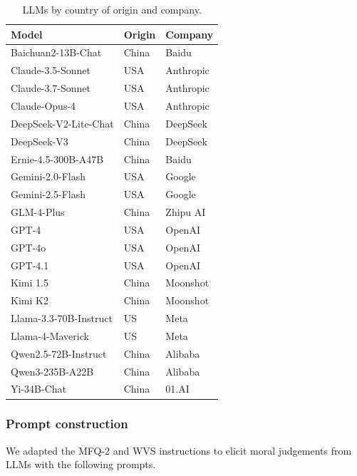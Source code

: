 \documentclass[11pt,a4paper]{article}
\begin{document}
\begin{table}[h]
\centering
\begin{tabular}{l l l}
Model & Origin & Company\\\hline
Baichuan2-13B-Chat & China & Baidu \\
Claude-3.5-Sonnet & USA & Anthropic \\
Claude-3.7-Sonnet & USA & Anthropic \\
Claude-Opus-4 & USA & Anthropic \\
DeepSeek-V2-Lite-Chat & China & DeepSeek \\
DeepSeek-V3 & China & DeepSeek \\
Ernie-4.5-300B-A47B & China & Baidu \\
Gemini-2.0-Flash & USA & Google \\
Gemini-2.5-Flash & USA & Google \\
GLM-4-Plus & China & Zhipu AI \\
GPT-4 & USA & OpenAI \\
GPT-4o & USA & OpenAI \\
GPT-4.1 & USA & OpenAI \\
Kimi 1.5 & China & Moonshot \\
Kimi K2 & China & Moonshot \\
Llama-3.3-70B-Instruct & US & Meta \\
Llama-4-Maverick & US & Meta \\
Qwen2.5-72B-Instruct & China & Alibaba \\
Qwen3-235B-A22B & China & Alibaba \\
Yi-34B-Chat & China & 01.AI \\\hline
\end{tabular}
\caption{LLMs by country of origin and company.}
\end{table}

\subsubsection{Prompt construction}

We adapted the MFQ-2 and WVS instructions to elicit moral judgements from LLMs with the following prompts.\\
\end{document}
